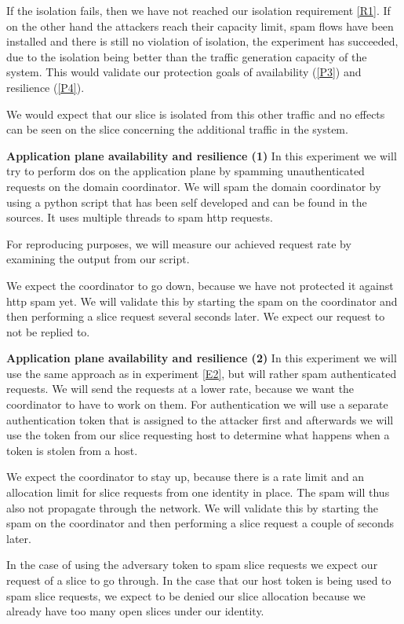 \begin{description}[style=multiline, labelwidth=0.7cm]
    If the isolation fails, then we have not reached our isolation requirement \ref{R1}. If on the other hand the attackers reach their capacity limit, spam flows have been installed and there is still no violation of isolation, the experiment has succeeded, due to the isolation being better than the traffic generation capacity of the system. This would validate our protection goals of availability (\ref{P3}) and resilience (\ref{P4}).

    We would expect that our slice is isolated from this other traffic and no effects can be seen on the slice concerning the additional traffic in the system.
\newpage
    \item[\namedlabel{E2}{E2}] \textbf{Application plane availability and resilience (1)} In this experiment we will try to perform \acrshort{dos} on the application plane by spamming unauthenticated requests on the domain coordinator. We will spam the domain coordinator by using a python script that has been self developed and can be found in the sources. It uses multiple threads to spam http requests.

    For reproducing purposes, we will measure our achieved request rate by examining the output from our script.

    We expect the coordinator to go down, because we have not protected it against http spam yet. We will validate this by starting the spam on the coordinator and then performing a slice request several seconds later. We expect our request to not be replied to.

    \item[\namedlabel{E3}{E3}] \textbf{Application plane availability and resilience (2)} In this experiment we will use the same approach as in experiment \ref{E2}, but will rather spam authenticated requests. We will send the requests at a lower rate, because we want the coordinator to have to work on them. For authentication we will use a separate authentication token that is assigned to the attacker first and afterwards we will use the token from our slice requesting host to determine what happens when a token is stolen from a host.

    We expect the coordinator to stay up, because there is a rate limit and an allocation limit for slice requests from one identity in place. The spam will thus also not propagate through the network. We will validate this by starting the spam on the coordinator and then performing a slice request a couple of seconds later.

    In the case of using the adversary token to spam slice requests we expect our request of a slice to go through. In the case that our host token is being used to spam slice requests, we expect to be denied our slice allocation because we already have too many open slices under our identity.


\end{description}
